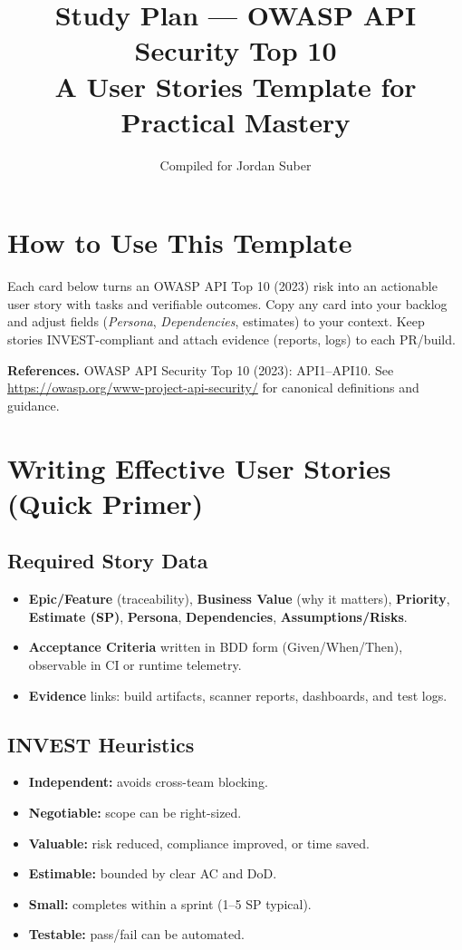 \documentclass[11pt,a4paper]{article}
\title{Study Plan --- OWASP API Security Top 10\\\large A User Stories Template for Practical Mastery}
\author{Compiled for Jordan Suber}
\date{}
\begin{document}
\maketitle
\tableofcontents
\newpage

\section*{How to Use This Template}
Each card below turns an OWASP API Top 10 (2023) risk into an actionable user story with tasks and verifiable outcomes. Copy any card into your backlog and adjust fields (\emph{Persona}, \emph{Dependencies}, estimates) to your context. Keep stories INVEST-compliant and attach evidence (reports, logs) to each PR/build.
\medskip

\noindent\textbf{References.} OWASP API Security Top 10 (2023): API1--API10. See \url{https://owasp.org/www-project-api-security/} for canonical definitions and guidance.

\section{Writing Effective User Stories (Quick Primer)}
\subsection*{Required Story Data}
\begin{itemize}
  \item \textbf{Epic/Feature} (traceability), \textbf{Business Value} (why it matters), \textbf{Priority}, \textbf{Estimate (SP)}, \textbf{Persona}, \textbf{Dependencies}, \textbf{Assumptions/Risks}.
  \item \textbf{Acceptance Criteria} written in BDD form (Given/When/Then), observable in CI or runtime telemetry.
  \item \textbf{Evidence} links: build artifacts, scanner reports, dashboards, and test logs.
\end{itemize}

\subsection*{INVEST Heuristics}
\begin{itemize}
  \item \textbf{Independent:} avoids cross-team blocking.
  \item \textbf{Negotiable:} scope can be right-sized.
  \item \textbf{Valuable:} risk reduced, compliance improved, or time saved.
  \item \textbf{Estimable:} bounded by clear AC and DoD.
  \item \textbf{Small:} completes within a sprint (1--5 SP typical).
  \item \textbf{Testable:} pass/fail can be automated.
\end{itemize}
\end{document}
